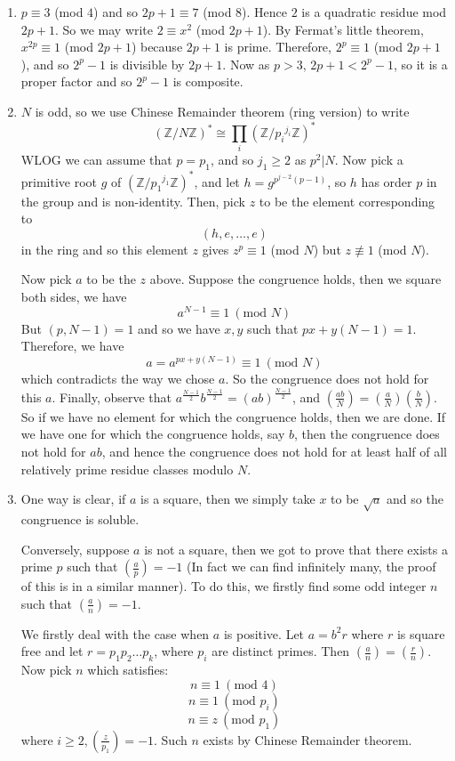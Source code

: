 \begin{enumerate}
\item $p \equiv 3$ (mod $4$) and so $2p+1 \equiv 7$ (mod $8$). Hence $2$ is a quadratic residue mod $2p+1$. So we may write $2 \equiv x^2$ (mod $2p+1$). By Fermat's little theorem,
    $x^{2p} \equiv 1$ (mod $2p+1$) because $2p+1$ is prime. Therefore, $2^p \equiv 1$ (mod $2p+1$), and so $2^p-1$ is divisible by $2p+1$. Now as $p >3$, $2p+1 < 2^p-1$, so it is a proper factor and so $2^p-1$ is composite.\\
\item $N$ is odd, so we use Chinese Remainder theorem (ring version) to write
     $$(\mathbb{Z}/N\mathbb{Z})^* \cong \prod_i (\mathbb{Z}/{p_i}^{j_i}\mathbb{Z})^*$$
     WLOG we can assume that $p=p_1$, and so $j_1 \ge 2$ as $p^2|N$. Now pick a primitive root $g$ of $(\mathbb{Z}/{p_1}^{j_1}\mathbb{Z})^*$, and let $h=g^{p^{j-2}(p-1)}$, so $h$ has order $p$ in the group and is non-identity. Then, pick $z$ to be the element corresponding to
     $$(h,e,\ldots,e )$$ in the ring and so this element $z$ gives $z^p \equiv 1$ (mod $N$) but
     $z \not \equiv 1$ (mod $N$).


     Now pick $a$ to be the $z$ above. Suppose the congruence holds, then we square both sides, we have
     $$a^{N-1} \equiv 1~(\text{mod } N)$$
     But $(p,N-1)=1$ and so we have $x,y$ such that $px+y(N-1)=1$. Therefore, we have
     $$a=a^{px+y(N-1)} \equiv 1~(\text{mod }N)$$
     which contradicts the way we chose $a$. So the congruence does not hold for this $a$.
     Finally, observe that $a^{\frac{N-1}{2}}b^{\frac{N-1}{2}}=(ab)^{\frac{N-1}{2}}$, and
     $(\frac{ab}{N})=(\frac{a}{N})(\frac{b}{N})$. So if we have no element for which the congruence holds, then we are done. If we have one for which the congruence holds, say $b$, then the congruence does not hold for $ab$,
     and hence the congruence does not hold for at least half of all relatively prime residue classes modulo $N$.
\item One way is clear, if $a$ is a square, then we simply take $x$ to be $\sqrt{a}$ and so the congruence is soluble.

    Conversely, suppose $a$ is not a square, then we got to prove that there exists a prime $p$ such that $(\frac{a}{p})=-1$ (In fact we can find infinitely many, the proof of this is in a similar manner). To do this, we firstly find some odd integer $n$ such that $(\frac{a}{n})=-1$.

    We firstly deal with the case when $a$ is positive. Let $a=b^2 r$ where $r$ is square free and let $r=p_1 p_2 \ldots p_k$, where $p_i$ are distinct primes. Then $(\frac{a}{n})=(\frac{r}{n})$.
    Now pick $n$ which satisfies:
    $$n \equiv 1~(\text{mod }4)$$
    $$n \equiv 1~(\text{mod }p_i)$$
    $$n \equiv z~(\text{mod }p_1)$$
    where $i \ge 2, (\frac{z}{p_1})=-1$. Such $n$ exists by Chinese Remainder theorem.


\end{enumerate}

